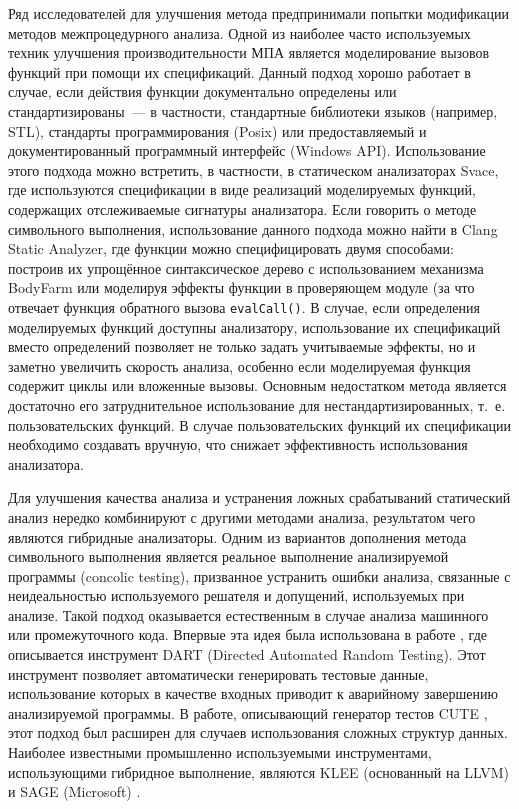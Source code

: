 Ряд исследователей для улучшения метода предпринимали попытки модификации методов межпроцедурного анализа. Одной из наиболее часто используемых техник улучшения производительности МПА является моделирование вызовов функций при помощи их спецификаций. Данный подход хорошо работает в случае, если действия функции документально определены или стандартизированы~--- в частности, стандартные библиотеки языков (например, STL), стандарты программирования (Posix) или предоставляемый и документированный программный интерфейс (Windows API). Использование этого подхода можно встретить, в частности, в статическом анализаторах Svace, где используются спецификации в виде реализаций моделируемых функций, содержащих отслеживаемые сигнатуры анализатора. Если  говорить о методе символьного выполнения, использование данного подхода можно найти в Clang Static Analyzer, где функции можно специфицировать двумя способами: построив их упрощённое синтаксическое дерево с использованием механизма BodyFarm или моделируя эффекты функции в проверяющем модуле (за что отвечает функция обратного вызова \texttt{evalCall()}. В случае, если определения моделируемых функций доступны анализатору, использование их спецификаций вместо определений позволяет не только задать учитываемые эффекты, но и заметно увеличить скорость анализа, особенно если моделируемая функция содержит циклы или вложенные вызовы. Основным недостатком метода является достаточно его затруднительное использование для нестандартизированных, т.~е. пользовательских функций. В случае пользовательских функций их спецификации необходимо создавать вручную, что снижает эффективность использования анализатора.

Для улучшения качества анализа и устранения ложных срабатываний статический анализ нередко комбинируют с другими методами анализа, результатом чего являются гибридные анализаторы. Одним из вариантов дополнения метода символьного выполнения является реальное выполнение анализируемой программы (concolic testing), призванное устранить ошибки анализа, связанные с неидеальностью используемого решателя и допущений, используемых при анализе. Такой подход оказывается естественным в случае анализа машинного или промежуточного кода. Впервые эта идея была использована в работе \cite{dart}, где описывается инструмент DART (Directed Automated Random Testing). Этот инструмент позволяет автоматически генерировать тестовые данные, использование которых в качестве входных приводит к аварийному завершению анализируемой программы. В работе, описывающий генератор тестов CUTE \cite{cute}, этот подход был расширен для случаев использования сложных структур данных. Наиболее известными промышленно используемыми инструментами, использующими гибридное выполнение, являются KLEE \cite{klee} (основанный на LLVM) и SAGE (Microsoft) \cite{sage}.

